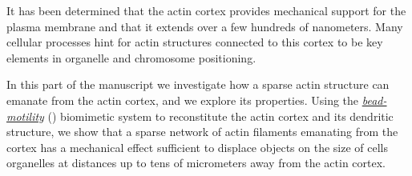 \documentclass[A4paperpaper,11pt,english]{sphinxmanual}
\begin{document}
It has been determined that the actin cortex provides mechanical support for the
plasma membrane and that it extends over a few hundreds of nanometers. Many
cellular processes hint for actin structures connected to this cortex to be
key elements in organelle and chromosome positioning.

In this part of the manuscript we investigate how a sparse actin structure can
emanate from the actin cortex, and we explore its properties. Using the
{\hyperref[index-latex:bead-motility-assay]{\emph{bead-motility}}} () biomimetic system to reconstitute
the actin cortex and its dendritic structure, we show that a sparse network of
actin filaments emanating from the cortex has a mechanical effect sufficient to
displace objects on the size of cells organelles at distances up to tens of micrometers
away from the actin cortex.
\end{document}
